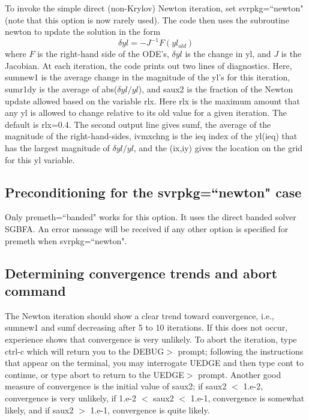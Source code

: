 \documentclass [12pt]{article}
\begin{document}
To invoke the simple direct (non-Krylov) Newton iteration, set {\sf
svrpkg=``newton"} (note that this option is now rarely used). The code then
uses the subroutine {\sf newton} to update the solution in the form
\begin{equation}
  \label{delyleq}
  \delta yl = -J^{-1} F(yl_{old})
\end{equation}
where $F$ is the right-hand side of the ODE's, $\delta yl$ is the change in
{\sf yl}, and $J$ is the Jacobian.  At each iteration, the code prints out two
lines of diagnostics.  Here, sumnew1 is the average change in the magnitude of
the {\sf yl}'s for this iteration, sumr1dy is the average of abs($\delta
yl/yl$), and saux2 is the fraction of the Newton update allowed based on the
variable rlx.  Here rlx is the maximum amount that any {\sf yl} is allowed to
change relative to its old value for a given iteration.  The default is
rlx=0.4.  The second output line gives sumf, the average of the magnitude of
the right-hand-sides, ivmxchng is the ieq index of the {\sf yl(ieq)} that has
the largest magnitude of $\delta yl/yl$, and the {\sf (ix,iy)} gives the
location on the grid for this {\sf yl} variable.
 
\subsection{Preconditioning for the {\sf svrpkg=``newton"} case}

Only {\sf premeth=``banded"} works for this option. It uses the direct banded
solver SGBFA.  An error message will be received if any other option is
specified for premeth when {\sf svrpkg=``newton"}.

\subsection{Determining convergence trends and abort command}
 
The Newton iteration should show a clear trend toward convergence, i.e.,
sumnew1 and sumf decreasing after 5 to 10 iterations.  If this does not occur,
experience shows that convergence is very unlikely.  To abort the iteration,
type ctrl-c which will return you to the DEBUG$>$ prompt; following the
instructions that appear on the terminal, you may interrogate {\sf UEDGE} and
then type {\sf cont} to continue, or type {\sf abort} to return to the {\sf
  UEDGE$>$} prompt. Another good measure of convergence is the initial value
of saux2; if saux2 $<$ 1.e-2, convergence is very unlikely, if 1.e-2 $<$ saux2
$<$ 1.e-1, convergence is somewhat likely, and if saux2 $>$ 1.e-1, convergence
is quite likely.
\end{document}

